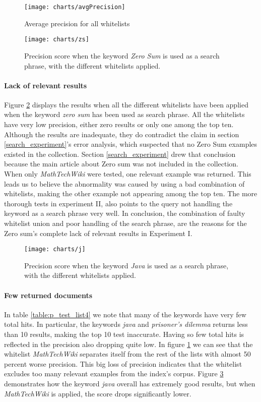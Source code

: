 \begin{figure}[H] 
\caption{Average precision for all whitelists}
\texttt{[image: charts/avgPrecision]}
\label{fig:avgPrecision}
\end{figure}

\begin{figure}[h] 
\caption{Precision score when the keyword \textit{Zero Sum} is used as a search phrase, with the different whitelists applied.}
\texttt{[image: charts/zs]}
\label{fig:zs}
\end{figure}

\paragraph{Lack of relevant results}
Figure \ref{fig:zs} displays the results when all the different whitelists have been applied when the keyword \textit{zero sum} has been used as search phrase. All the whitelists have very low precision, either zero results or only one among the top ten. Although the results are inadequate, they do contradict the claim in section \ref{search_experiment}'s error analysis, which suspected that no Zero Sum examples existed in the collection. Section \ref{search_experiment} drew that conclusion because the main article about Zero sum was not included in the collection. When only \textit{MathTechWiki} were tested, one relevant example was returned. This leads us to believe the abnormality was caused by using a bad combination of whitelists, making the other example not appearing among the top ten. The more thorough tests in experiment II, also points to the query not handling the keyword as a search phrase very well. In conclusion, the combination of faulty whitelist union and poor handling of the search phrase, are the reasons for the Zero sum's complete lack of relevant results in Experiment I.

\begin{figure}[h] 
\caption{Precision score when the keyword \textit{Java} is used as a search phrase, with the different whitelists applied.}
\texttt{[image: charts/j]}
\label{fig:j}
\end{figure}

\paragraph{Few returned documents}
In table \ref{table:p_test_list4} we note that many of the keywords have very few total hits. In particular, the keywords \textit{java} and \textit{prisoner's dilemma} returns less than 10 results, making the top 10 test inaccurate. Having so few total hits is reflected in the precision also dropping quite low. In figure \ref{fig:avgPrecision} we can see that the whitelist \textit{MathTechWiki} separates itself from the rest of the lists with almost 50 percent worse precision. This big loss of precision indicates that the whitelist excludes too many relevant examples from the index's corpus. Figure \ref{fig:j} demonstrates how the keyword \textit{java} overall has extremely good results, but when \textit{MathTechWiki} is applied, the score drops significantly lower.


